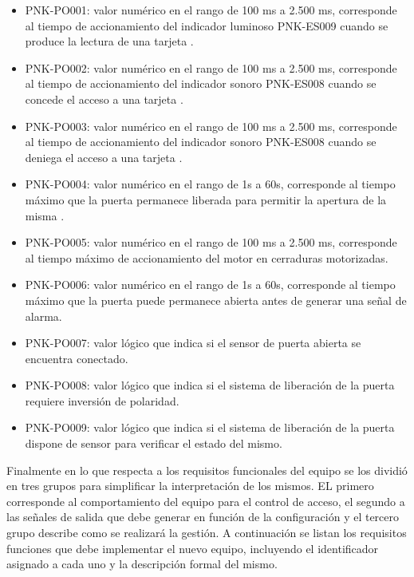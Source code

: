 \begin{itemize}
	\item PNK-PO001: valor numérico en el rango de 100 ms a 2.500 ms, corresponde al tiempo de accionamiento del indicador luminoso PNK-ES009 cuando se produce la lectura de una tarjeta .
	\item PNK-PO002: valor numérico en el rango de 100 ms a 2.500 ms, corresponde al tiempo de accionamiento del indicador sonoro PNK-ES008 cuando se concede el acceso a una tarjeta .
	\item PNK-PO003: valor numérico en el rango de 100 ms a 2.500 ms, corresponde al tiempo de accionamiento del indicador sonoro PNK-ES008 cuando se deniega el acceso a una tarjeta .
	\item PNK-PO004: valor numérico en el rango de 1s a 60s, corresponde al tiempo máximo que la puerta permanece liberada para permitir la apertura de la misma .
	\item PNK-PO005: valor numérico en el rango de 100 ms a 2.500 ms, corresponde al tiempo máximo de accionamiento del motor en cerraduras motorizadas.
	\item PNK-PO006: valor numérico en el rango de 1s a 60s, corresponde al tiempo máximo que la puerta puede permanece abierta antes de generar una señal de alarma.
	\item PNK-PO007: valor lógico que indica si el sensor de puerta abierta se encuentra conectado.
	\item PNK-PO008: valor lógico que indica si el sistema de liberación de la puerta requiere inversión de polaridad.
	\item PNK-PO009: valor lógico que indica si el sistema de liberación de la puerta dispone de sensor para verificar el estado del mismo.
\end{itemize}

Finalmente en lo que respecta a los requisitos funcionales del equipo se los dividió en tres grupos para simplificar la interpretación de los mismos. EL primero corresponde al comportamiento del equipo para el control de acceso, el segundo a las señales de salida que debe generar en función de la configuración y el tercero grupo describe como se realizará la gestión. A continuación se listan los requisitos funciones que debe implementar el nuevo equipo, incluyendo el identificador asignado a cada uno y la descripción formal del mismo.

